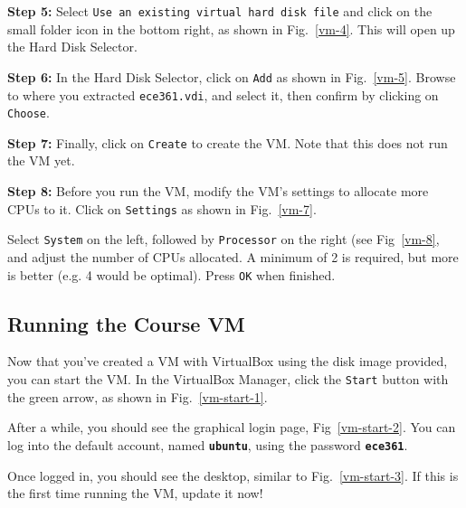 \documentclass[11pt]{article}
\begin{document}
\textbf{Step 5:} Select \texttt{Use an existing virtual hard disk file} and click on the small folder icon in the bottom right, as shown in Fig.~\ref{vm-4}. This will open up the Hard Disk Selector.

\textbf{Step 6:} In the Hard Disk Selector, click on \texttt{Add} as shown in Fig.~\ref{vm-5}. Browse to where you extracted \texttt{ece361.vdi}, and select it, then confirm by clicking on \texttt{Choose}.

\textbf{Step 7:} Finally, click on \texttt{Create} to create the VM. Note that this does not run the VM yet.

\textbf{Step 8:} Before you run the VM, modify the VM's settings to allocate more CPUs to it. Click on \texttt{Settings} as shown in Fig.~\ref{vm-7}.

Select \texttt{System} on the left, followed by \texttt{Processor} on the right (see Fig~\ref{vm-8}, and adjust the number of CPUs allocated. A minimum of 2 is required, but more is better (e.g. 4 would be optimal). Press \texttt{OK} when finished.

\subsection{Running the Course VM}
\label{subsec:run-vm}
Now that you've created a VM with VirtualBox using the disk image provided, you can start the VM. In the VirtualBox Manager, click the \texttt{Start} button with the green arrow, as shown in Fig.~\ref{vm-start-1}.

After a while, you should see the graphical login page, Fig~\ref{vm-start-2}. You can log into the default account, named \textbf{\texttt{ubuntu}}, using the password \textbf{\texttt{ece361}}.

Once logged in, you should see the desktop, similar to Fig.~\ref{vm-start-3}. If this is the first time running the VM, update it now!
\end{document}
